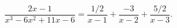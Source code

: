 \begin{example}
	\begin{equation*}
		\frac{2x-1}{x^3-6x^2+11x-6} = \frac{1/2}{x-1}+\frac{-3}{x-2}+\frac{5/2}{x-3}.
	\end{equation*}
\end{example}